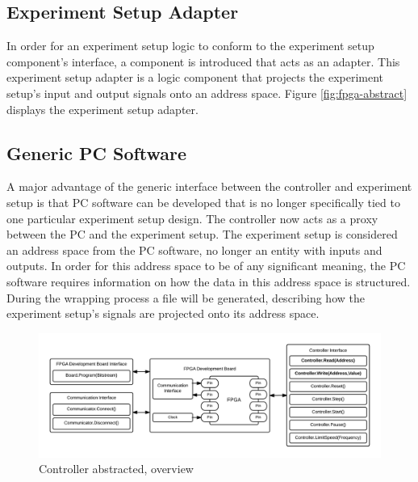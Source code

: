 \documentclass[openright]{template/uva-bachelor-thesis}
\begin{document}
\subsection{Experiment Setup Adapter}

In order for an experiment setup logic to conform to the experiment setup component's interface, a component is introduced that acts as an adapter. This experiment setup adapter is a logic component that projects the experiment setup's input and output signals onto an address space. Figure \ref{fig:fpga-abstract} displays the experiment setup adapter.




\subsection{Generic PC Software}
A major advantage of the generic interface between the controller and experiment setup is that PC software can be developed that is no longer specifically tied to one particular experiment setup design. The controller now acts as a proxy between the PC and the experiment setup. The experiment setup is considered an address space from the PC software, no longer an entity with inputs and outputs. In order for this address space to be of any significant meaning, the PC software requires information on how the data in this address space is structured. During the wrapping process a file will be generated, describing how the experiment setup's signals are projected onto its address space. 




\begin{figure}[h]
\centering
\includegraphics[width=\textwidth]{img/overview-abstract}
\caption{Controller abstracted, overview}
\label{fig:overview-abstract}
\end{figure}


\end{document}
